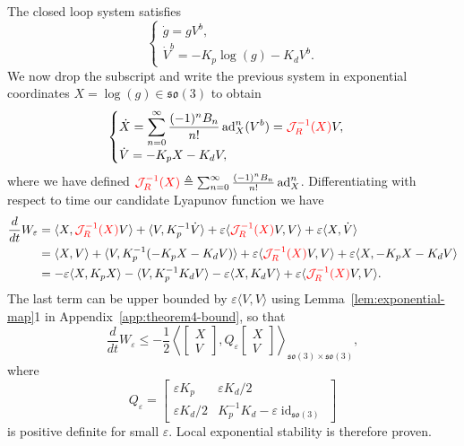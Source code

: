 \documentclass[11pt]{article}
\newcommand{\rev}[1]{\textcolor{red}{#1}}
\newcommand{\JopR}{\mathcal J_R}
\newcommand{\so}{\mathfrak{so}}
\newcommand{\ad}{\operatorname{ad}}
\newcommand{\id}{\operatorname{id}}
\newcommand{\eps}{\varepsilon}
\begin{document}
The closed loop system satisfies
\begin{equation*}
\begin{cases}
\dot g=gV^b,\\
\dot V^b=-K_p\log(g)-K_dV^b.
\end{cases}
\end{equation*}
We now drop the subscript and write the previous system in exponential coordinates $X=\log(g)\in\so(3)$ to obtain
\begin{equation*}
\begin{cases}
\displaystyle \dot X=\sum_{n=0}^{\infty}\frac{(-1)^nB_n}{n!}\ad_X^n(V^b)=\rev{\JopR^{-1}(X)}V,\\[4pt]
\dot V=-K_pX-K_dV,
\end{cases}
\end{equation*}
where we have defined $\rev{\JopR^{-1}(X)}\triangleq\sum_{n=0}^{\infty}\frac{(-1)^nB_n}{n!}\ad_X^n$. Differentiating with respect to time our candidate Lyapunov function we have
\begin{align*}
\frac{d}{dt}W_\eps
&=\langle X,\rev{\JopR^{-1}(X)}V\rangle+\langle V,K_p^{-1}\dot V\rangle
+\eps\langle\rev{\JopR^{-1}(X)}V,V\rangle+\eps\langle X,\dot V\rangle\\
&=\langle X,V\rangle+\langle V,K_p^{-1}(-K_pX-K_dV)\rangle
+\eps\langle\rev{\JopR^{-1}(X)}V,V\rangle+\eps\langle X,-K_pX-K_dV\rangle\\
&=-\eps\langle X,K_pX\rangle-\langle V,K_p^{-1}K_dV\rangle-\eps\langle X,K_dV\rangle
+\eps\langle\rev{\JopR^{-1}(X)}V,V\rangle.
\end{align*}
The last term can be upper bounded by $\eps\langle V,V\rangle$ using Lemma~\ref{lem:exponential-map}1 in Appendix~\ref{app:theorem4-bound}, so that
\begin{equation*}
\frac{d}{dt}W_\eps\le -\frac12\left\langle\begin{bmatrix}X\\V\end{bmatrix},Q_\eps\begin{bmatrix}X\\V\end{bmatrix}\right\rangle_{\so(3)\times\so(3)},
\end{equation*}
where
\begin{equation*}
Q_\eps=\begin{bmatrix}\eps K_p&\eps K_d/2\\\eps K_d/2&K_p^{-1}K_d-\eps\id_{\so(3)}\end{bmatrix}
\end{equation*}
is positive definite for small $\eps$. Local exponential stability is therefore proven.
\end{document}
